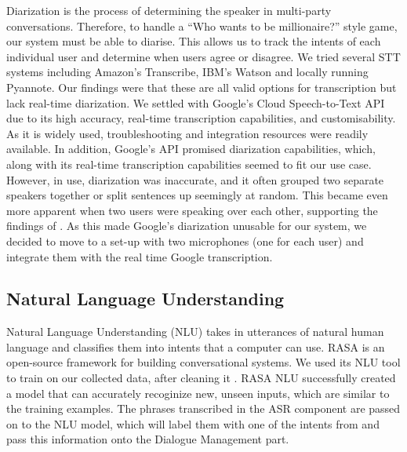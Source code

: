 \documentclass[hidelinks, 11pt]{article}
\begin{document}
Diarization is the process of determining the speaker in multi-party conversations. Therefore, to handle a ``Who wants to be millionaire?'' style game, our system must be able to diarise. This allows us to track the intents of each individual user and determine when users agree or disagree.
We tried several STT systems including Amazon's Transcribe, IBM's Watson and locally running Pyannote. Our findings were that these are all valid options for transcription but lack real-time diarization. We settled with Google's Cloud Speech-to-Text API due to its high accuracy, real-time transcription capabilities, and customisability. As it is widely used, troubleshooting and integration resources were readily available. In addition, Google's API promised diarization capabilities, which, along with its real-time transcription capabilities seemed to fit our use case. However, in use, diarization was inaccurate, and it often grouped two separate speakers together or split sentences up seemingly at random. This became even more apparent when two users were speaking over each other, supporting the findings of \cite{addlesee_comprehensive_2020}. As this made Google's diarization unusable for our system, we decided to move to a set-up with two microphones (one for each user) and integrate them with the real time Google transcription.

\subsection{Natural Language Understanding}
\label{subsec:nlu}

Natural Language Understanding (NLU) takes in utterances of natural human language and classifies them into intents that a computer can use. RASA is an open-source framework for building conversational systems. We used its NLU tool to train on our collected data, after cleaning it . RASA NLU successfully created a model that can accurately recoginize new, unseen inputs, which are similar to the training examples. The phrases transcribed in the ASR component are passed on to the NLU model, which will label them with one of the intents from  and pass this information onto the Dialogue Management part.

\end{document}
